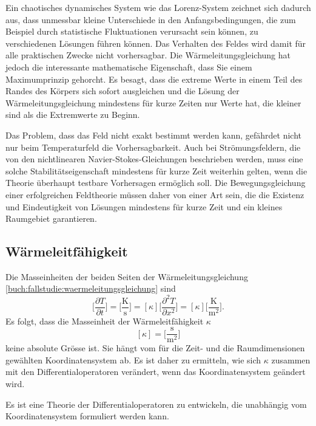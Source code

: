 Ein chaotisches dynamisches System wie das Lorenz-System zeichnet sich
dadurch aus, dass unmessbar kleine Unterschiede in den Anfangsbedingungen,
die zum Beispiel durch statistische Fluktuationen verursacht sein können,
zu verschiedenen Lösungen führen können.
%
Das Verhalten des Feldes wird damit für alle praktischen Zwecke nicht
vorhersagbar.
Die Wärmeleitungsgleichung hat jedoch die interessante mathematische
Eigenschaft, dass Sie einem Maximumprinzip gehorcht.
%
Es besagt, dass die extreme Werte in einem Teil des Randes des Körpers
sich sofort ausgleichen und die Lösung der Wärmeleitungsgleichung
mindestens für kurze Zeiten nur Werte hat, die kleiner sind als die 
Extremwerte zu Beginn.

Das Problem, dass das Feld nicht exakt bestimmt werden kann, gefährdet
nicht nur beim Temperaturfeld die Vorhersagbarkeit.
Auch bei Strömungsfeldern, die von den nichtlinearen
Navier-Stokes-Gleichungen beschrieben werden, muss eine solche
%
Stabilitätseigenschaft mindestens für kurze Zeit weiterhin gelten,
wenn die Theorie überhaupt testbare Vorhersagen ermöglich soll.
Die Bewegungsgleichung einer erfolgreichen Feldtheorie müssen daher
von einer Art sein, die die Existenz und Eindeutigkeit von Lösungen
mindestens für kurze Zeit und ein kleines Raumgebiet garantieren.

%
%
\subsection{Wärmeleitfähigkeit}
Die Masseinheiten der beiden Seiten der Wärmeleitungsgleichung 
\eqref{buch:fallstudie:waermeleitungsgleichung}
sind
\[
\biggl[
\frac{\partial T}{\partial t}
\biggr]
=
\biggl[
\frac{\text{K}}{\text{s}}
\biggr]
=
[\kappa]
\biggl[
\frac{\partial^2 T}{\partial x^2}
\biggr]
=
[\kappa]
\biggl[
\frac{\text{K}}{\text{m}^2}
\biggr].
\]
Es folgt, dass die Masseinheit der Wärmeleitfähigkeit $\kappa$
%
%
\[
[\kappa]
=
\biggl[
\frac{\text{s}}{\text{m}^2}
\biggr]
\]
keine absolute Grösse ist.
Sie hängt vom für die Zeit- und die Raumdimensionen gewählten
Koordinatensystem ab.
Es ist daher zu ermitteln, wie sich $\kappa$ zusammen mit den
Differentialoperatoren verändert, wenn das Koordinatensystem
geändert wird.

\begin{aufgabe}
Es ist eine Theorie der Differentialoperatoren zu entwickeln, die
unabhängig vom Koordinatensystem formuliert werden kann.
\end{aufgabe}

